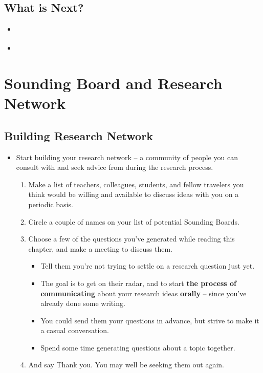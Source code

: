 \documentclass[11pt]{article}
\begin{document}
\subsection{What is Next?}
\begin{itemize}
\item \begin{exercise}
\end{exercise}

\vspace{20pt}
\item \begin{exercise}
\end{exercise}
\end{itemize}

\newpage
\section{Sounding Board and Research Network}
\subsection{Building Research Network}
\begin{itemize}
\item  \begin{exercise}

Start building your research network -- a community of people you can consult with and seek advice from during the research process. 
\begin{enumerate}
\item Make a list of teachers, colleagues, students, and fellow travelers you think would be willing and available to discuss ideas with you on a periodic basis. 

\item Circle a couple of names on your list of potential Sounding Boards.

\item Choose a few of the questions you’ve generated while reading this chapter, and make a meeting to discuss them. 
\begin{itemize}
\item  Tell them you’re not trying to settle on a research question just yet. 
 
\item  The goal is to get on their radar, and to start \textbf{the process of communicating} about your research ideas \textbf{orally} -- since you’ve already done some writing.

\item  You could send them your questions in advance, but strive to make it a casual conversation.

\item Spend some time generating questions about a topic together.
\end{itemize}

\item And say Thank you. You may well be seeking them out again.
\end{enumerate}
\end{exercise}
\end{itemize}
\end{document}
